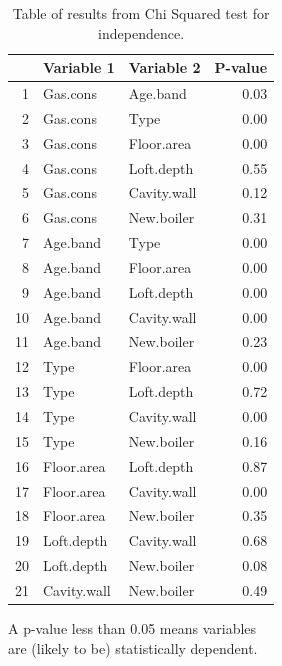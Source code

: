 \documentclass[9pt]{extarticle}
\begin{document}
\begin{table}[H]
	\centering
	\begin{tabular}{r|llr}
		\hline
		& Variable 1 & Variable 2 & P-value \\ 
		\hline
		1 & Gas.cons & Age.band & 0.03 \\ 
		2 & Gas.cons & Type & 0.00 \\ 
		3 & Gas.cons & Floor.area & 0.00 \\ 
		4 & Gas.cons & Loft.depth & 0.55 \\ 
		5 & Gas.cons & Cavity.wall & 0.12 \\ 
		6 & Gas.cons & New.boiler & 0.31 \\ 
		7 & Age.band & Type & 0.00 \\ 
		8 & Age.band & Floor.area & 0.00 \\ 
		9 & Age.band & Loft.depth & 0.00 \\ 
		10 & Age.band & Cavity.wall & 0.00 \\ 
		11 & Age.band & New.boiler & 0.23 \\ 
		12 & Type & Floor.area & 0.00 \\ 
		13 & Type & Loft.depth & 0.72 \\ 
		14 & Type & Cavity.wall & 0.00 \\ 
		15 & Type & New.boiler & 0.16 \\ 
		16 & Floor.area & Loft.depth & 0.87 \\ 
		17 & Floor.area & Cavity.wall & 0.00 \\ 
		18 & Floor.area & New.boiler & 0.35 \\ 
		19 & Loft.depth & Cavity.wall & 0.68 \\ 
		20 & Loft.depth & New.boiler & 0.08 \\ 
		21 & Cavity.wall & New.boiler & 0.49 \\ 
		\hline
	\end{tabular}

\vspace{0.5em}
A p-value less than 0.05 means variables \\are (likely to be) statistically dependent.
\caption{Table of results from Chi Squared test for independence. }
\label{tab:chi}
\end{table}
\end{document}
